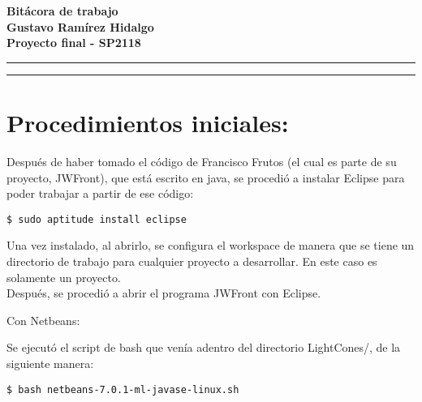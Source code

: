 \documentclass[letter]{article}
\newcommand{\entitle}[1]{
  \vspace{0.3cm}%
  \noindent%
  \textbf{#1}%
  \vspace{0.2cm}%
  \hrule\vspace*{0.5mm}%
  \noindent%
  \rule{\linewidth}{0.5mm}%
  \vspace{0.5cm}%
}%
\begin{document}

\newcommand{\uic}{blue} %
\newcommand{\uim}{\_\_} %
\newcommand{\userinput}[1]{\textcolor{\uic}{\uim#1\uim}}
























\begin{center}
\entitle{Bitácora de trabajo \\ Gustavo Ramírez Hidalgo \\ Proyecto final - SP2118}
\end{center}







\section{\normalsize Procedimientos iniciales:}
Después de haber tomado el código de Francisco Frutos (el cual es parte de su proyecto, JWFront), que está escrito en java, se procedió a instalar Eclipse para poder trabajar a partir de ese código:
\lstset{language=bash}
\begin{lstlisting}
$ sudo aptitude install eclipse
\end{lstlisting}
Una vez instalado, al abrirlo, se configura el workspace de manera que se tiene un directorio de trabajo para cualquier proyecto a desarrollar. En este caso es solamente un proyecto.\\
Después, se procedió a abrir el programa JWFront con Eclipse.

Con Netbeans:

Se ejecutó el script de bash que venía adentro del directorio LightCones/, de la siguiente manera:
\lstset{language=bash}
\begin{lstlisting}
$ bash netbeans-7.0.1-ml-javase-linux.sh
\end{lstlisting}
\end{document}
